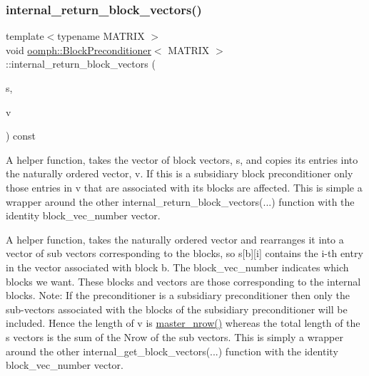 \mbox{\label{classoomph_1_1BlockPreconditioner_a9e2ce77e3efbcdd465f7ad7252936dfd}} 
\subsubsection{\texorpdfstring{internal\+\_\+return\+\_\+block\+\_\+vectors()}{internal\_return\_block\_vectors()}\hspace{0.1cm}{\footnotesize\ttfamily [2/2]}}
{\footnotesize\ttfamily template$<$typename M\+A\+T\+R\+IX $>$ \\
void \hyperlink{classoomph_1_1BlockPreconditioner}{oomph\+::\+Block\+Preconditioner}$<$ M\+A\+T\+R\+IX $>$\+::internal\+\_\+return\+\_\+block\+\_\+vectors (\begin{DoxyParamCaption}\item[{const \hyperlink{classoomph_1_1Vector}{Vector}$<$ \hyperlink{classoomph_1_1DoubleVector}{Double\+Vector} $>$ \&}]{s,  }\item[{\hyperlink{classoomph_1_1DoubleVector}{Double\+Vector} \&}]{v }\end{DoxyParamCaption}) const}



A helper function, takes the vector of block vectors, s, and copies its entries into the naturally ordered vector, v. If this is a subsidiary block preconditioner only those entries in v that are associated with its blocks are affected. This is simple a wrapper around the other internal\+\_\+return\+\_\+block\+\_\+vectors(...) function with the identity block\+\_\+vec\+\_\+number vector. 

A helper function, takes the naturally ordered vector and rearranges it into a vector of sub vectors corresponding to the blocks, so s\mbox{[}b\mbox{]}\mbox{[}i\mbox{]} contains the i-\/th entry in the vector associated with block b. The block\+\_\+vec\+\_\+number indicates which blocks we want. These blocks and vectors are those corresponding to the internal blocks. Note\+: If the preconditioner is a subsidiary preconditioner then only the sub-\/vectors associated with the blocks of the subsidiary preconditioner will be included. Hence the length of v is \hyperlink{classoomph_1_1BlockPreconditioner_a3e5b553f65e6c25354a5c908d507e8ee}{master\+\_\+nrow()} whereas the total length of the s vectors is the sum of the Nrow of the sub vectors. This is simply a wrapper around the other internal\+\_\+get\+\_\+block\+\_\+vectors(...) function with the identity block\+\_\+vec\+\_\+number vector. 

